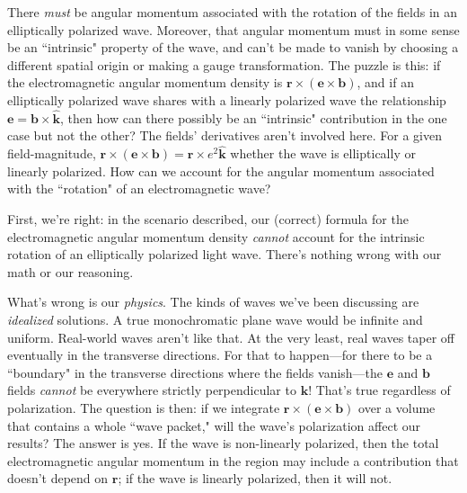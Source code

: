 \documentclass[12pt]{article}
\renewcommand{\vv}[1]{\mathbf{#1}}
\begin{document}
There \emph{must} be angular momentum associated with the rotation of the fields in an elliptically polarized wave. Moreover, that angular momentum must in some sense be an ``intrinsic" property of the wave, and can't be made to vanish by choosing a different spatial origin or making a gauge transformation. The puzzle is this: if the electromagnetic angular momentum density is $\vv r \times (\vv e \times \vv b)$, and if an elliptically polarized wave shares with a linearly polarized wave the relationship ${\vv e = \vv b \times \vv{\hat k}}$, then how can there possibly be an ``intrinsic" contribution in the one case but not the other? The fields' derivatives aren't involved here. For a given field-magnitude, ${\vv r \times (\vv e \times \vv b) = \vv r \times e^2 \vv{\hat k}}$ whether the wave is elliptically or linearly polarized. How can we account for the angular momentum associated with the ``rotation" of an electromagnetic wave?

First, we're right: in the scenario described, our (correct) formula for the electromagnetic angular momentum density \emph{cannot} account for the intrinsic rotation of an elliptically polarized light wave. There's nothing wrong with our math or our reasoning.

What's wrong is our \emph{physics}. The kinds of waves we've been discussing are \emph{idealized} solutions. A true monochromatic plane wave would be infinite and uniform. Real-world waves aren't like that. At the very least, real waves taper off eventually in the transverse directions. For that to happen---for there to be a ``boundary" in the transverse directions where the fields vanish---the $\vv e$ and $\vv b$ fields \emph{cannot} be everywhere strictly perpendicular to $\vv k$! That's true regardless of polarization. The question is then: if we integrate $\vv r \times (\vv e \times \vv b)$ over a volume that contains a whole ``wave packet," will the wave's polarization affect our results? The answer is yes. If the wave is non-linearly polarized, then the total electromagnetic angular momentum in the region may include a contribution that doesn't depend on $\vv r$; if the wave is linearly polarized, then it will not.
\end{document}
